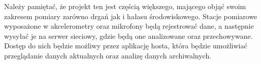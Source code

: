 \documentclass[a4paper,12pt]{mwart}
\begin{document}
Należy pamiętać, że projekt ten jest częścią większego, mającego objąć swoim
zakresem pomiary zarówno drgań jak i hałasu środowiskowego. Stacje pomiarowe
wyposażone w akcelerometry oraz mikrofony będą rejestrować dane, a następnie
wysyłać je na serwer sieciowy, gdzie będą one analizowane oraz przechowywane.
Dostęp do nich będzie możliwy przez aplikację hosta, która będzie umożliwiać
przeglądanie danych aktualnych oraz analizę danych archiwalnych.

\printbibliography[title=Bibliografia]
\end{document}
